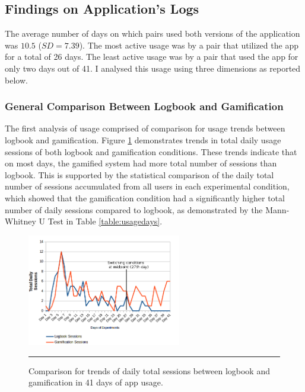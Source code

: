 \subsection{Findings on Application's Logs}
\label{usageoutcome}
The average number of days on which pairs used both versions of the application was $10.5$ ($SD=7.39$). The most active usage was by a pair that utilized the app for a total of 26 days. The least active usage was by a pair that used the app for only two days out of 41. I analysed this usage using three dimensions as reported below.
\subsubsection*{General Comparison Between Logbook and Gamification}
The first analysis of usage comprised of comparison for usage trends between logbook and gamification. Figure \ref{figure:usagedailysessions} demonstrates trends in total daily usage sessions of both logbook and gamification conditions. These trends indicate that on most days, the gamified system had more total number of sessions than logbook. This is supported by the statistical comparison of the daily total number of sessions accumulated from all users in each experimental condition, which showed that the gamification condition had a significantly higher total number of daily sessions compared to logbook, as demonstrated by the Mann-Whitney U Test in Table \ref{table:usagedays}.

\begin{figure}[htbp]
  \centering
    \includegraphics[width=0.6\textwidth]{Figures/scatter_daily_sessions.png}
    \rule{35em}{0.5pt}
  \caption{Comparison for trends of daily total sessions between logbook and gamification in 41 days of app usage.}
  \label{figure:usagedailysessions}
\end{figure}


